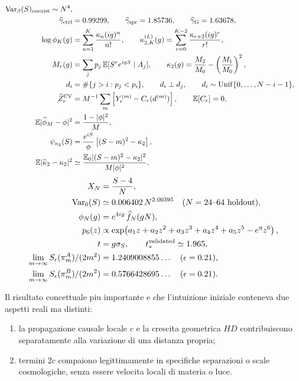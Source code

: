 \documentclass[11pt,a4paper]{article}
\begin{document}
\begin{align}
\mathrm{Var}_{\beta}(S)_{\rm coexist}\sim N^4,\\
\widehat\gamma_{\rm ctrl}&=0.99299,\qquad
\widehat\gamma_{\rm spr}=1.85736,\qquad
\widehat\gamma_{\rm G}=1.63678,\\
\log\phi_K(g)&=\sum_{n=1}^{K}\frac{\kappa_n(ig)^n}{n!},\qquad
\kappa_{2,K}^{(L)}(g)=\sum_{r=0}^{K-2}\frac{\kappa_{r+2}(ig)^r}{r!},\\
M_r(g)&=\sum_j p_j\,\mathbb E[S^r e^{igS}\mid A_j],\qquad
\kappa_2(g)=\frac{M_2}{M_0}-\left(\frac{M_1}{M_0}\right)^2,\\
d_i&=\#\{j>i:p_j<p_i\},\qquad d_i\perp d_j,\qquad d_i\sim\mathrm{Unif}\{0,\ldots,N-i-1\},\\
\widehat Z_r^{\rm CV}&=M^{-1}\sum_m\left[Y_r^{(m)}-C_r(d^{(m)})\right],\qquad \mathbb E[C_r]=0,\\
\mathbb E|\widehat\phi_M-\phi|^2&=\frac{1-|\phi|^2}{M},\\
\psi_{\kappa_2}(S)&=\frac{e^{iS}}{\phi}\left[(S-m)^2-\kappa_2\right],\\
\mathbb E|\widehat\kappa_2-\kappa_2|^2&\simeq\frac{\mathbb E_0| (S-m)^2-\kappa_2|^2}{M|\phi|^2}.
\end{align}
\begin{align}
X_N&=\frac{S-4}{N},\\
\mathrm{Var}_0(S)&\simeq 0.006402\,N^{2.00395}\quad(N=24\text{--}64\ \text{holdout}),\\
\phi_N(g)&=e^{4ig}\,\widehat f_N(gN),\\
p_6(z)&\propto\exp\!\left(a_1z+a_2z^2+a_3z^3+a_4z^4+a_5z^5-e^\eta z^6\right),\\
t&=g\sigma_S,\qquad t_*^{\rm validated}\simeq1.965,\\
\lim_{m\to\infty}S_\epsilon(\pi_m^A)/(2m^2)&=1.2409008855\ldots\quad(\epsilon=0.21),\\
\lim_{m\to\infty}S_\epsilon(\pi_m^B)/(2m^2)&=0.5766428695\ldots\quad(\epsilon=0.21).
\end{align}

Il risultato concettuale piu importante e che l'intuizione iniziale conteneva due aspetti reali ma distinti:
\begin{enumerate}
\item la propagazione causale locale $c$ e la crescita geometrica $HD$ contribuiscono separatamente alla variazione di una distanza propria;
\item termini $2c$ compaiono legittimamente in specifiche separazioni o scale cosmologiche, senza essere velocita locali di materia o luce.
\end{enumerate}
\end{document}
